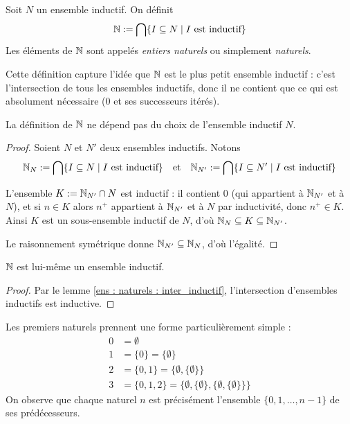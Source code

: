 \begin{definition}\label{ens : naturels : def}
	Soit $N$ un ensemble inductif. On définit
    \[
    \mathbb{N} := \bigcap \{I \subseteq N \mid I \text{ est inductif}\}
    \]
	Les éléments de $\mathbb{N}$ sont appelés \emph{entiers naturels} ou simplement \emph{naturels}.
\end{definition}

\begin{remarque}
    Cette définition capture l'idée que $\mathbb{N}$ est le plus petit ensemble inductif : c'est l'intersection de tous les ensembles inductifs, donc il ne contient que ce qui est absolument nécessaire ($0$ et ses successeurs itérés).
\end{remarque}

\begin{proposition}
	La définition de $\mathbb{N}$ ne dépend pas du choix de l'ensemble inductif $N$.
\end{proposition}

\begin{proof}
	Soient $N$ et $N'$ deux ensembles inductifs. Notons 
    \[
    \mathbb{N}_N :=\bigcap\{I\subseteq N \mid I \text{ est inductif}\}
    \quad \text{et} \quad
    \mathbb{N}_{N'} :=\bigcap\{I\subseteq N' \mid I \text{ est inductif}\}
    \]
	
    L'ensemble $K := \mathbb{N}_{N'} \cap N$ est inductif : il contient $0$ (qui appartient à $\mathbb{N}_{N'}$ et à $N$), et si $n \in K$ alors $n^+$ appartient à $\mathbb{N}_{N'}$ et à $N$ par inductivité, donc $n^+ \in K$. Ainsi $K$ est un sous-ensemble inductif de $N$, d'où $\mathbb{N}_N \subseteq K \subseteq \mathbb{N}_{N'}$.
	
    Le raisonnement symétrique donne $\mathbb{N}_{N'} \subseteq \mathbb{N}_N$, d'où l'égalité.
\end{proof}

\begin{corollaire}
    $\mathbb{N}$ est lui-même un ensemble inductif.
\end{corollaire}

\begin{proof}
    Par le lemme \ref{ens : naturels : inter_inductif}, l'intersection d'ensembles inductifs est inductive.
\end{proof}

\begin{exemple}
	Les premiers naturels prennent une forme particulièrement simple :
	\begin{align*}
		0 &= \emptyset\\
        1 &= \{0\} = \{\emptyset\}\\
        2 &= \{0, 1\} = \{\emptyset, \{\emptyset\}\}\\
        3 &= \{0, 1, 2\} = \{\emptyset, \{\emptyset\}, \{\emptyset, \{\emptyset\}\}\}
	\end{align*}
    On observe que chaque naturel $n$ est précisément l'ensemble $\{0, 1, \ldots, n-1\}$ de ses prédécesseurs.
\end{exemple}
